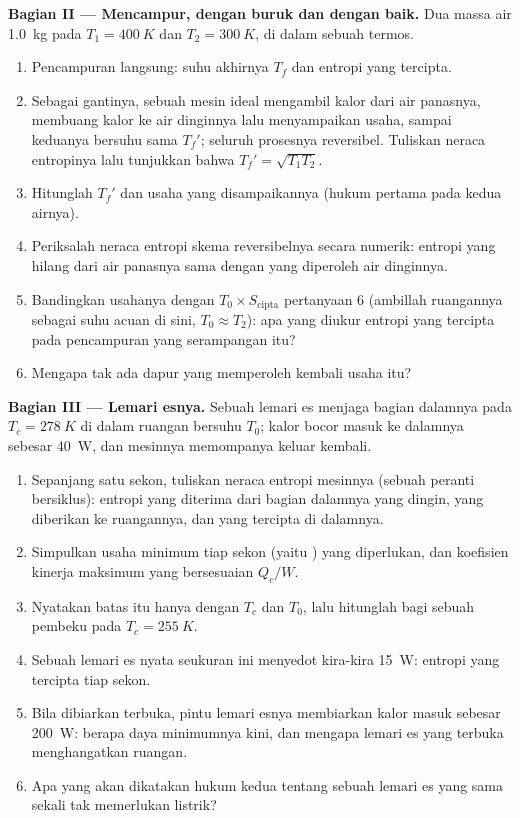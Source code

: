 \begin{problem}
\medskip
\noindent\textbf{Bagian II --- Mencampur, dengan buruk dan dengan baik.}
Dua massa air \qty{1.0}{kg} pada $T_1 = \qty{400}{K}$ dan $T_2 =
\qty{300}{K}$, di dalam sebuah termos.
\begin{enumerate}[resume]
  \item Pencampuran langsung: suhu akhirnya $T_f$ dan entropi yang tercipta.
  \item Sebagai gantinya, sebuah mesin ideal mengambil kalor dari air panasnya, membuang
        kalor ke air dinginnya lalu menyampaikan usaha, sampai keduanya bersuhu
        sama $T_f'$; seluruh prosesnya reversibel. Tuliskan
        neraca entropinya lalu tunjukkan bahwa $T_f' = \sqrt{T_1T_2}$.
  \item Hitunglah $T_f'$ dan usaha yang disampaikannya (hukum pertama pada kedua
        airnya).
  \item Periksalah neraca entropi skema reversibelnya secara numerik:
        entropi yang hilang dari air panasnya sama dengan yang diperoleh air dinginnya.
  \item Bandingkan usahanya dengan $T_0 \times S_{\mathrm{cipta}}$ pertanyaan 6
        (ambillah ruangannya sebagai suhu acuan di sini, $T_0 \approx T_2$):
        apa yang diukur entropi yang tercipta pada pencampuran yang serampangan itu?
  \item Mengapa tak ada dapur yang memperoleh kembali usaha itu?
\end{enumerate}

\medskip
\noindent\textbf{Bagian III --- Lemari esnya.}
Sebuah lemari es menjaga bagian dalamnya pada $T_c = \qty{278}{K}$ di dalam ruangan bersuhu
$T_0$; kalor bocor masuk ke dalamnya sebesar \qty{40}{W}, dan mesinnya memompanya keluar kembali.
\begin{enumerate}[resume]
  \item Sepanjang satu sekon, tuliskan neraca entropi mesinnya (sebuah
        peranti bersiklus): entropi yang diterima dari bagian dalamnya yang dingin, yang diberikan ke
        ruangannya, dan yang tercipta di dalamnya.
  \item Simpulkan usaha minimum tiap sekon (yaitu ) yang diperlukan,
        dan koefisien kinerja maksimum yang bersesuaian
        $Q_c/W$.
  \item Nyatakan batas itu hanya dengan $T_c$ dan $T_0$, lalu hitunglah
        bagi sebuah pembeku pada $T_c = \qty{255}{K}$.
  \item Sebuah lemari es nyata seukuran ini menyedot kira-kira \qty{15}{W}: entropi
        yang tercipta tiap sekon.
  \item Bila dibiarkan terbuka, pintu lemari esnya membiarkan kalor masuk sebesar \qty{200}{W}:
        berapa daya minimumnya kini, dan mengapa lemari es yang terbuka menghangatkan ruangan.
  \item Apa yang akan dikatakan hukum kedua tentang sebuah lemari es yang sama sekali
        tak memerlukan listrik?
\end{enumerate}


\end{problem}
